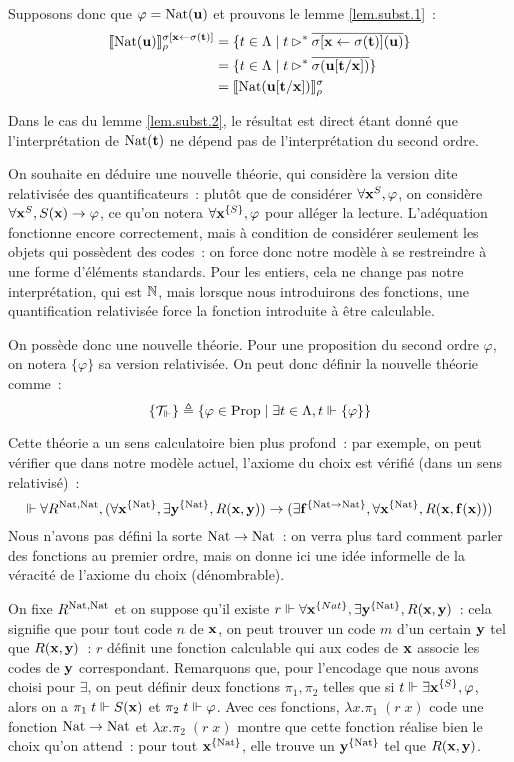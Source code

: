 \documentclass{article}
\begin{document}
Supposons donc que $\varphi = \mathrm{Nat}(\mathbf{u})$ et prouvons le lemme \ref{lem.subst.1}~:
\begin{align*}
    \llbracket \mathrm{Nat}(\mathbf{u}) \rrbracket_\rho^{\sigma[\mathbf{x}\leftarrow \sigma(\mathbf{t})]} &= \{t \in \Lambda\mid t \rhd^* \overline{\sigma[\mathbf{x}\leftarrow\sigma(\mathbf{t})](\mathbf{u})}\}\\
    &= \{ t \in \Lambda\mid t \rhd^* \overline{\sigma(\mathbf{u}[\mathbf{t}/\mathbf{x}])}\}\\
    &= \llbracket \mathrm{Nat}(\mathbf{u}[\mathbf{t}/\mathbf{x}]) \rrbracket_\rho^\sigma
\end{align*}

Dans le cas du lemme \ref{lem.subst.2}, le résultat est direct étant donné que l'interprétation de $\mathrm{Nat}(\mathbf{t})$ ne dépend pas de l'interprétation du second ordre.

On souhaite en déduire une nouvelle théorie, qui considère la version dite relativisée des quantificateurs~: plutôt que de considérer $\forall \mathbf{x}^S, \varphi$, on considère $\forall \mathbf{x}^S, S(\mathbf{x}) \to \varphi$, ce qu'on notera $\forall \mathbf{x}^{\{S\}}, \varphi$ pour alléger la lecture. L'adéquation fonctionne encore correctement, mais à condition de considérer seulement les objets qui possèdent des codes~: on force donc notre modèle à se restreindre à une forme d'éléments standards. Pour les entiers, cela ne change pas notre interprétation, qui est $\mathbb{N}$, mais lorsque nous introduirons des fonctions, une quantification relativisée force la fonction introduite à être calculable.

On possède donc une nouvelle théorie. Pour une proposition du second ordre $\varphi$, on notera $\{\varphi\}$ sa version relativisée. On peut donc définir la nouvelle théorie comme~:
\[\{\mathcal T_\Vdash\} \triangleq \{\varphi \in \mathrm{Prop}\mid \exists t \in \Lambda, t \Vdash\{\varphi\}\}\]

Cette théorie a un sens calculatoire bien plus profond~: par exemple, on peut vérifier que dans notre modèle actuel, l'axiome du choix est vérifié (dans un sens relativisé)~:
\[\Vdash \forall R^{\mathrm{Nat},\mathrm{Nat}},(\forall \mathbf{x}^{\{\mathrm{Nat}\}}, \exists \mathbf{y}^{\{\mathrm{Nat}\}}, R(\mathbf{x},\mathbf{y}))\to (\exists \mathbf{f}^{\{\mathrm{Nat}\to\mathrm{Nat}\}}, \forall \mathbf{x}^{\{\mathrm{Nat}\}}, R(\mathbf{x},\mathbf{f}(\mathbf{x})))\]
Nous n'avons pas défini la sorte $\mathrm{Nat}\to\mathrm{Nat}$~: on verra plus tard comment parler des fonctions au premier ordre, mais on donne ici une idée informelle de la véracité de l'axiome du choix (dénombrable).

On fixe $R^{\mathrm{Nat},\mathrm{Nat}}$ et on suppose qu'il existe $r\Vdash \forall \mathbf{x}^{\{Nat\}}, \exists \mathbf{y}^{\{\mathrm{Nat}\}}, R(\mathbf{x},\mathbf{y})$~: cela signifie que pour tout code $n$ de $\mathbf{x}$, on peut trouver un code $m$ d'un certain $\mathbf{y}$ tel que $R(\mathbf{x},\mathbf{y})$~: $r$ définit une fonction calculable qui aux codes de $\mathbf{x}$ associe les codes de $\mathbf{y}$ correspondant. Remarquons que, pour l'encodage que nous avons choisi pour $\exists$, on peut définir deux fonctions $\pi_1,\pi_2$ telles que si $t \Vdash \exists \mathbf{x}^{\{S\}}, \varphi$, alors on a $\pi_1\;t\Vdash S(\mathbf{x})$ et $\pi_2\;t\Vdash \varphi$. Avec ces fonctions, $\lambda x.\pi_1\;(r\;x)$ code une fonction $\mathrm{Nat}\to\mathrm{Nat}$ et $\lambda x.\pi_2\;(r\;x)$ montre que cette fonction réalise bien le choix qu'on attend~: pour tout $\mathbf{x}^{\{\mathrm{Nat}\}}$, elle trouve un $\mathbf{y}^{\{\mathrm{Nat}\}}$ tel que $R(\mathbf{x},\mathbf{y})$.
\end{document}
